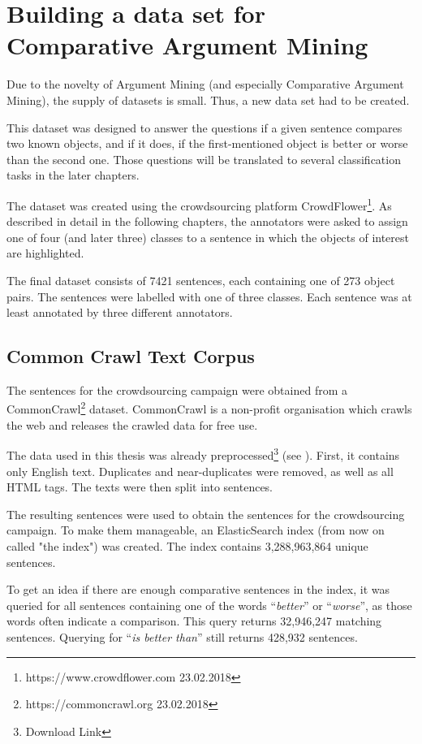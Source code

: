 \chapter{Building a data set for Comparative Argument Mining}
Due to the novelty of Argument Mining (and especially Comparative Argument Mining), the supply of datasets is small. Thus, a new data set had to be created.

This dataset was designed to answer the questions if a given sentence compares two known objects, and if it does, if the first-mentioned object is better or worse than the second one. Those questions will be translated to several classification tasks in the later chapters.

The dataset was created using the crowdsourcing platform CrowdFlower\footnote{https://www.crowdflower.com 23.02.2018}. As described in detail in the following chapters, the annotators were asked to assign one of four (and later three) classes to a sentence in which the objects of interest are highlighted.

The final dataset consists of 7421 sentences, each containing one of 273 object pairs. The sentences were labelled with one of three classes. Each sentence was at least annotated by three different annotators.

\section{Common Crawl Text Corpus}
The sentences for the crowdsourcing campaign were obtained from a CommonCrawl\footnote{https://commoncrawl.org 23.02.2018} dataset. CommonCrawl is a non-profit organisation which crawls the web and releases the crawled data for free use.

The data used in this thesis was already preprocessed\footnote{Download Link} (see \cite{Panchenko:2017aa}). First, it contains only English text. Duplicates and near-duplicates were removed, as well as all HTML tags. The texts were then split into sentences.

The resulting sentences were used to obtain the sentences for the crowdsourcing campaign. To make them manageable, an ElasticSearch index (from now on called "the index") was created. The index contains 3,288,963,864 unique sentences.

To get an idea if there are enough comparative sentences in the index, it was queried for all sentences containing one of the words \enquote{\emph{better}} or \enquote{\emph{worse}},  as those words often indicate a comparison. This query returns 32,946,247 matching sentences. Querying for \enquote{\emph{is better than}} still returns 428,932 sentences.

